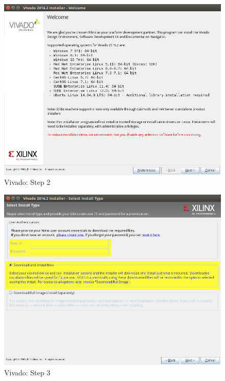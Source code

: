 \begin{figure}
    \centering
    \includegraphics[width=1\textwidth]{images/devguide/vivado-install-00.png}
    \caption[Vivado: Step 2]{%
        Vivado: Step 2
    }
    \label{fig:devguide:vivado2}
\end{figure}

\begin{figure}
    \centering
    \includegraphics[width=1\textwidth]{images/devguide/vivado-install-01.png}
    \caption[Vivado: Step 3]{%
        Vivado: Step 3
    }
    \label{fig:devguide:vivado3}
\end{figure}

